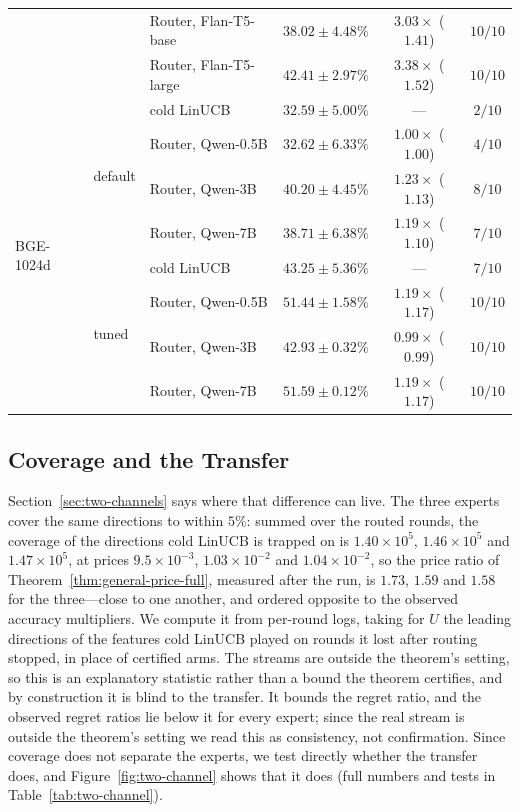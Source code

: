 \documentclass[anon]{alt2027} %
\begin{document}
\begin{table}[ht]
\begin{tabular}{@{}lllccc@{}}
& & Router, Flan-T5-base & $38.02\pm4.48\%$ & $3.03\times$ ($1.41$) & $10/10$ \\
& & Router, Flan-T5-large & $42.41\pm2.97\%$ & $3.38\times$ ($1.52$) & $10/10$ \\
\midrule
\multirow{8}{*}{BGE-1024d} & \multirow{4}{*}{default} & cold LinUCB & $32.59\pm5.00\%$ & --- & $2/10$ \\
& & Router, Qwen-0.5B & $32.62\pm6.33\%$ & $1.00\times$ ($1.00$) & $4/10$ \\
& & Router, Qwen-3B & $40.20\pm4.45\%$ & $1.23\times$ ($1.13$) & $8/10$ \\
& & Router, Qwen-7B & $38.71\pm6.38\%$ & $1.19\times$ ($1.10$) & $7/10$ \\
\cmidrule(lr){2-6}
& \multirow{4}{*}{tuned} & cold LinUCB & $43.25\pm5.36\%$ & --- & $7/10$ \\
& & Router, Qwen-0.5B & $51.44\pm1.58\%$ & $1.19\times$ ($1.17$) & $10/10$ \\
& & Router, Qwen-3B & $42.93\pm0.32\%$ & $0.99\times$ ($0.99$) & $10/10$ \\
& & Router, Qwen-7B & $51.59\pm0.12\%$ & $1.19\times$ ($1.17$) & $10/10$ \\
\bottomrule
\end{tabular}
\end{table}

\subsection{Coverage and the Transfer}
\label{app:amazon-transfer}
\label{app:two-channel}

Section~\ref{sec:two-channels} says where that difference can live. The three
experts cover the same directions to within $5\%$: summed over the routed
rounds, the coverage of the directions cold LinUCB is trapped on is
$1.40\times10^5$, $1.46\times10^5$ and $1.47\times10^5$, at prices
$9.5\times10^{-3}$, $1.03\times10^{-2}$ and $1.04\times10^{-2}$, so the price
ratio of Theorem~\ref{thm:general-price-full}, measured after the run, is $1.73$,
$1.59$ and $1.58$ for the three---close to one another, and ordered opposite
to the observed accuracy multipliers. We compute it from per-round logs, taking for $U$
the leading directions of the features cold LinUCB played on rounds it lost
after routing stopped, in place of certified arms. The streams are outside
the theorem's setting, so this is an explanatory statistic rather than a
bound the theorem certifies, and by construction it is blind to the
transfer. It bounds the regret ratio, and the observed regret ratios lie
below it for every expert; since the real stream is outside the theorem's
setting we read this as consistency, not confirmation. Since coverage does
not separate the experts, we test directly whether the transfer does, and
Figure~\ref{fig:two-channel} shows that it does (full numbers and tests in
Table~\ref{tab:two-channel}).
\end{document}
